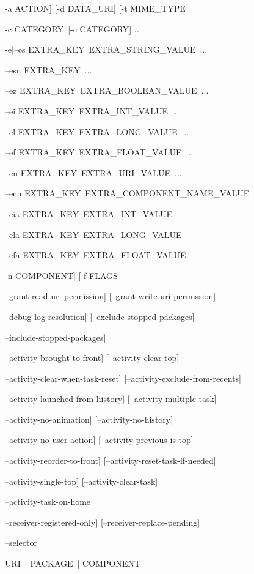 \begin{coloredenumerate}
\item -a \lt ACTION\gt] [-d \lt DATA\_URI\gt] [-t \lt MIME\_TYPE\gt
\item -c \lt CATEGORY\gt\ [-c \lt CATEGORY\gt] ...
\item -e|--es \lt EXTRA\_KEY\gt\ \lt EXTRA\_STRING\_VALUE\gt\ ...
\item --esn \lt EXTRA\_KEY\gt\ ...
\item --ez \lt EXTRA\_KEY\gt\ \lt EXTRA\_BOOLEAN\_VALUE\gt\ ...
\item --ei \lt EXTRA\_KEY\gt\ \lt EXTRA\_INT\_VALUE\gt\ ...
\item --el \lt EXTRA\_KEY\gt\ \lt EXTRA\_LONG\_VALUE\gt\ ...
\item --ef \lt EXTRA\_KEY\gt\ \lt EXTRA\_FLOAT\_VALUE\gt\ ...
\item --eu \lt EXTRA\_KEY\gt\ \lt EXTRA\_URI\_VALUE\gt\ ...
\item --ecn \lt EXTRA\_KEY\gt\ \lt EXTRA\_COMPONENT\_NAME\_VALUE\gt
\item --eia \lt EXTRA\_KEY\gt\ \lt EXTRA\_INT\_VALUE
\item --ela \lt EXTRA\_KEY\gt\ \lt EXTRA\_LONG\_VALUE
\item --efa \lt EXTRA\_KEY\gt\ \lt EXTRA\_FLOAT\_VALUE
\item -n \lt COMPONENT\gt] [-f \lt FLAGS\gt
\item --grant-read-uri-permission] [--grant-write-uri-permission]
\item --debug-log-resolution] [--exclude-stopped-packages]
\item --include-stopped-packages]
\item --activity-brought-to-front] [--activity-clear-top]
\item --activity-clear-when-task-reset] [--activity-exclude-from-recents]
\item --activity-launched-from-history] [--activity-multiple-task]
\item --activity-no-animation] [--activity-no-history]
\item --activity-no-user-action] [--activity-previous-is-top]
\item --activity-reorder-to-front] [--activity-reset-task-if-needed]
\item --activity-single-top] [--activity-clear-task]
\item --activity-task-on-home
\item --receiver-registered-only] [--receiver-replace-pending]
\item --selector
\item \lt URI\gt\ | \lt PACKAGE\gt\ | \lt COMPONENT\gt
\end{coloredenumerate}

